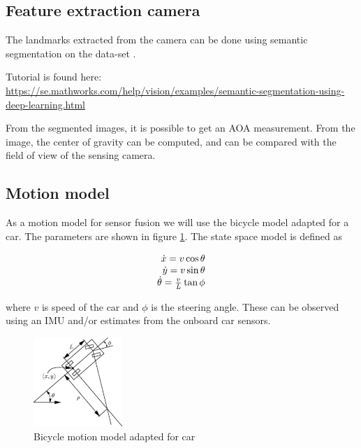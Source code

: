 \subsection{Feature extraction camera}

The landmarks extracted from the camera can be done using semantic
segmentation on the data-set \cite{Brostow:2009:SOC:1464534.1465403}.

Tutorial is found here:
\url{https://se.mathworks.com/help/vision/examples/semantic-segmentation-using-deep-learning.html}

From the segmented images, it is possible to get an \gls{AOA}
measurement. From the image, the center of gravity can be computed,
and can be compared with the field of view of the sensing camera.

\subsection{Motion model}
As a motion model for sensor fusion we will use the bicycle model adapted for a car.
The parameters are shown in figure \ref{fig:motion_model}. The state space model is defined as

\begin{equation}
 \begin{array}[b]{r}
  \dot{x} = v \cos \theta \\
  \dot{y} = v \sin \theta \\
  \dot{\theta} = \frac{v}{L} \tan{\phi}
 \end{array}
\end{equation}

where $v$ is speed of the car and $\phi$ is the steering angle. 
These can be observed using an IMU and/or estimates from the onboard car sensors.


\begin{figure}
\label{fig:motion_model}
\includegraphics[width=0.3\textwidth]{figures/bicycle_model.pdf}
\caption{Bicycle motion model adapted for car}
\end{figure}



